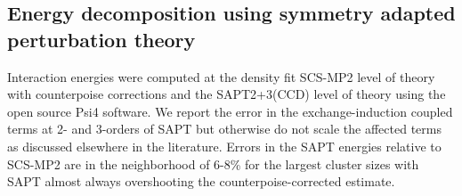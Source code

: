 \begin{sie}
   \subsection{\label{ch3:sec1:level3}Energy decomposition using symmetry adapted perturbation theory}
    Interaction energies were computed at the density fit SCS-MP2 level of theory with counterpoise corrections\cite{boys1970bsse} and the 
    SAPT2+3(CCD)\cite{jeziorski1994sapt,hohenstein2010df,hohenstein2012sapt} level of theory using the open source Psi4\cite{sherrill2012psi4} 
    software. We report the error in the exchange-induction coupled terms at 2- and 3-orders of SAPT but otherwise do not scale the
    affected terms as discussed elsewhere in the literature\cite{hohenstein2011scale,herbert2012break}. Errors in the SAPT energies relative
    to SCS-MP2 are in the neighborhood of 6-8\% for the largest cluster sizes with SAPT almost always overshooting the counterpoise-corrected 
    estimate.
    

\end{sie}
